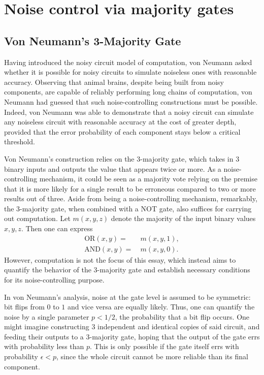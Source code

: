 \documentclass[12pt,reqno]{amsart}
\theoremstyle{plain} %
\theoremstyle{remark}
\theoremstyle{definition}
\begin{document}
    
\section{Noise control via majority gates} 

\subsection{Von Neumann's 3-Majority Gate}

Having introduced the noisy circuit model of computation, von Neumann asked whether it is possible for noisy circuits to simulate noiseless ones with reasonable accuracy. Observing that animal brains, despite being built from noisy components, are capable of reliably performing long chains of computation, von Neumann had guessed that such noise-controlling constructions must be possible. Indeed, von Neumann was able to demonstrate that a noisy circuit can simulate any noiseless circuit with reasonable accuracy at the cost of greater depth, provided that the error probability of each component stays below a critical threshold.

Von Neumann's construction relies on the 3-majority gate, which takes in $3$ binary inputs and outputs the value that appears twice or more. As a noise-controlling mechanism, it could be seen as a majority vote relying on the premise that it is more likely for a single result to be erroneous compared to two or more results out of three. Aside from being a noise-controlling mechanism, remarkably, the 3-majority gate, when combined with a NOT gate, also suffices for carrying out computation. Let $m(x,y,z)$ denote the majority of the input binary values $x,y,z$. Then one can express
\begin{align}
    \text{OR}(x,y)=&\ m(x,y,1),\\
    \text{AND}(x,y)=&\ m(x,y,0).
\end{align}
However, computation is not the focus of this essay, which instead aims to quantify the behavior of the 3-majority gate and establish necessary conditions for its noise-controlling purpose.

In von Neumann's analysis, noise at the gate level is assumed to be symmetric: bit flips from $0$ to $1$ and vice versa are equally likely. Thus, one can quantify the noise by a single parameter $p<1/2$, the probability that a bit flip occurs. One might imagine constructing $3$ independent and identical copies of said circuit, and feeding their outputs to a $3$-majority gate, hoping that the output of the gate errs with probability less than $p$. This is only possible if the gate itself errs with probability $\epsilon<p$, since the whole circuit cannot be more reliable than its final component.
\end{document}
